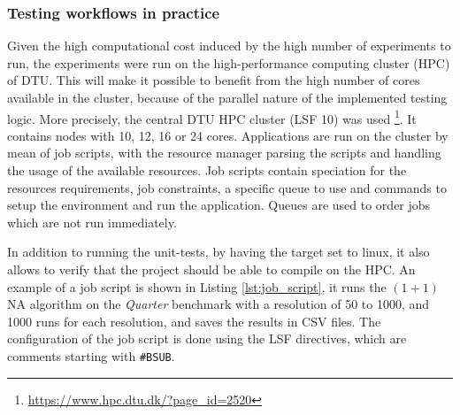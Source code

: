 \subsubsection{Testing workflows in practice}

Given the high computational cost induced by the high number of experiments to run, the experiments were run on the high-performance computing cluster (HPC) of DTU.
This will make it possible to benefit from the high number of cores available in the cluster, because of the parallel nature of the implemented testing logic.
More precisely, the central DTU HPC cluster (LSF 10) was used \footnote{\url{https://www.hpc.dtu.dk/?page_id=2520}}.
It contains nodes with 10, 12, 16 or 24 cores. Applications are run on the cluster by mean of job scripts, with the resource manager
parsing the scripts and handling the usage of the available resources. Job scripts contain speciation for the resources requirements, job constraints, a specific queue to use and commands to setup the environment
and run the application. Queues are used to order jobs which are not run immediately.

In addition to running the unit-tests, by having the target set to linux, it also allows to verify that the project should be able to compile on the HPC.
An example of a job script is shown in Listing \ref{lst:job_script}, it runs the $(1 + 1)$ NA algorithm on the \textit{Quarter} benchmark with a resolution of 50 to 1000, and 1000 runs
for each resolution, and saves the results in CSV files. The configuration of the job script is done using the LSF directives, which are comments starting with \texttt{\#BSUB}.

